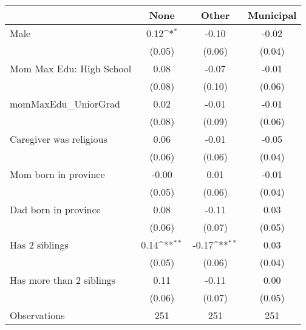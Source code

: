 {
\def\sym#1{\ifmmode^{#1}\else\(^{#1}\)\fi}
\begin{tabular}{l*{3}{c}}
\toprule
                    &\multicolumn{1}{c}{None}&\multicolumn{1}{c}{Other}&\multicolumn{1}{c}{Municipal}\\
\midrule
Male                &        0.12\sym{*}  &       -0.10         &       -0.02         \\
                    &      (0.05)         &      (0.06)         &      (0.04)         \\
\addlinespace
Mom Max Edu: High School&        0.08         &       -0.07         &       -0.01         \\
                    &      (0.08)         &      (0.10)         &      (0.06)         \\
\addlinespace
momMaxEdu\_UniorGrad &        0.02         &       -0.01         &       -0.01         \\
                    &      (0.08)         &      (0.09)         &      (0.06)         \\
\addlinespace
Caregiver was religious&        0.06         &       -0.01         &       -0.05         \\
                    &      (0.06)         &      (0.06)         &      (0.04)         \\
\addlinespace
Mom born in province&       -0.00         &        0.01         &       -0.01         \\
                    &      (0.05)         &      (0.06)         &      (0.04)         \\
\addlinespace
Dad born in province&        0.08         &       -0.11         &        0.03         \\
                    &      (0.06)         &      (0.07)         &      (0.05)         \\
\addlinespace
Has 2 siblings      &        0.14\sym{**} &       -0.17\sym{**} &        0.03         \\
                    &      (0.05)         &      (0.06)         &      (0.04)         \\
\addlinespace
Has more than 2 siblings&        0.11         &       -0.11         &        0.00         \\
                    &      (0.06)         &      (0.07)         &      (0.05)         \\
\midrule
Observations        &         251         &         251         &         251         \\
\bottomrule
\end{tabular}
}
